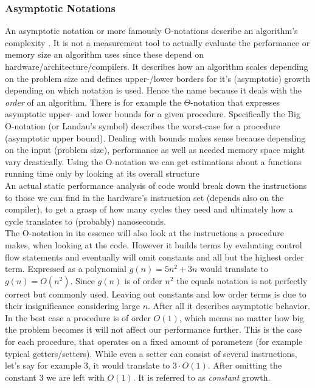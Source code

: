 \subsubsection{Asymptotic Notations}\label{asymptotic_notations}
An asymptotic notation or more famously O-notations describe an algorithm's complexity . It is not a measurement tool to actually evaluate the performance or memory size an algorithm uses since these depend on hardware/architecture/compilers. It describes how an algorithm scales depending on the problem size and defines upper-/lower borders for it's (asymptotic) growth depending on which notation is used. Hence the name because it deals with the \textit{order} of an algorithm.
There is for example the $\Theta$-notation that expresses asymptotic upper- and lower bounds for a given procedure.
Specifically the Big O-notation (or Landau's symbol) describes the worst-case for a procedure (asymptotic upper bound). Dealing with bounds makes sense because depending on the input (problem size), performance as well as needed memory space might vary drastically. Using the O-notation we can get estimations about a functions running time only by looking at its overall structure \\
An actual static performance analysis of code would break down the instructions to those we can find in the hardware's instruction set (depends also on the compiler), to get a grasp of how many cycles they need and ultimately how a cycle translates to (probably) nanoseconds.\\
The O-notation in its essence will also look at the instructions a procedure makes, when looking at the code. However it builds terms by evaluating control flow statements and eventually will omit constants and all but the highest order term. Expressed as a polynomial $g(n) = 5n^2+3n$ would translate to $g(n) = O(n^2)$. Since $g(n)$ is of order $n^2$ the equals notation is not perfectly correct but commonly used. Leaving out constants and low order terms is due to their insignificance considering large $n$. After all it describes asymptotic behavior.\\
In the best case a procedure is of order $O(1)$, which means no matter how big the problem becomes it will not affect our performance further. This is the case for each procedure, that operates on a fixed amount of parameters (for example typical getters/setters). While even a setter can consist of several instructions, let's say for example 3, it would translate to $3\cdot O(1)$. After omitting the constant $3$ we are left with $O(1)$. It is referred to as \textit{constant} growth.\\
